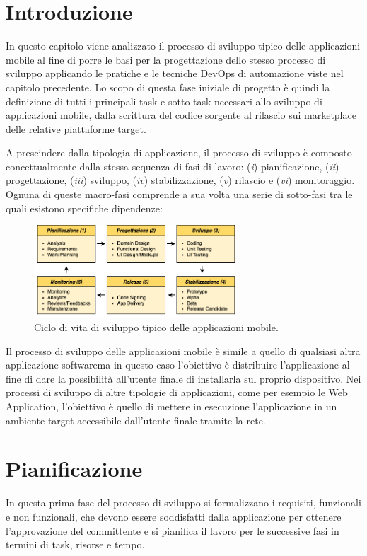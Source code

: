 
\section{Introduzione}
In questo capitolo viene analizzato il processo di sviluppo tipico delle applicazioni mobile al fine di porre le basi per la progettazione dello stesso processo di sviluppo applicando le pratiche e le tecniche DevOps di automazione viste nel capitolo precedente. Lo scopo di questa fase iniziale di progetto è quindi la definizione di tutti i principali task e sotto-task necessari allo sviluppo di applicazioni mobile, dalla scrittura del codice sorgente al rilascio sui marketplace delle relative piattaforme target. 

A prescindere dalla tipologia di applicazione, il processo di sviluppo è composto concettualmente dalla stessa sequenza di fasi di lavoro: (\textit{i}) pianificazione, (\textit{ii}) progettazione, (\textit{iii}) sviluppo, (\textit{iv}) stabilizzazione, (\textit{v}) rilascio e (\textit{vi}) monitoraggio. Ognuna di queste macro-fasi comprende a sua volta una serie di sotto-fasi tra le quali esistono specifiche dipendenze:

\begin{figure}[H]
    \centering
    \includegraphics[width=0.67\textwidth]{img/sdlc.png}
    \caption{Ciclo di vita di sviluppo tipico delle applicazioni mobile.}
    \label{sdlc-app-mobile-fig}
\end{figure}

Il processo di sviluppo delle applicazioni mobile è simile a quello di qualsiasi altra applicazione softwarema in questo caso l'obiettivo è distribuire l'applicazione al fine di dare la possibilità all'utente finale di installarla sul proprio dispositivo. Nei processi di sviluppo di altre tipologie di applicazioni, come per esempio le Web Application, l'obiettivo è quello di mettere in esecuzione l'applicazione in un ambiente target accessibile dall'utente finale tramite la rete.

\section{Pianificazione}
In questa prima fase del processo di sviluppo si formalizzano i requisiti, funzionali e non funzionali, che devono essere soddisfatti dalla applicazione per ottenere l'approvazione del committente e si pianifica il lavoro per le successive fasi in termini di task, risorse e tempo.

